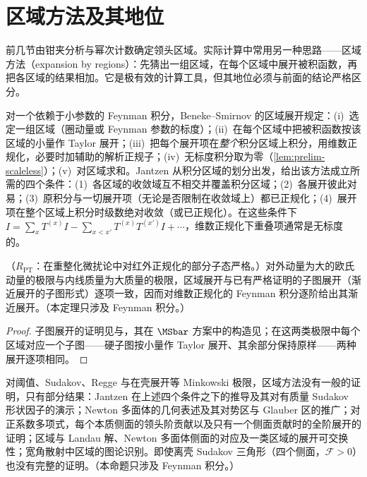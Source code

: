 \section{区域方法及其地位}\label{sec:ir-regions}

前几节由钳夹分析与幂次计数确定领头区域。实际计算中常用另一种思路——区域方法（expansion by regions）：先猜出一组区域，在每个区域中展开被积函数，再把各区域的结果相加。它是极有效的计算工具，但其地位必须与前面的结论严格区分。

\begin{definition}[区域方法]\label{def:ir-regions}
对一个依赖于小参数的 Feynman 积分，Beneke--Smirnov 的区域展开\cite{BenekeSmirnov1998}规定：(i)~选定一组区域（圈动量或 Feynman 参数的标度）；(ii)~在每个区域中把被积函数按该区域的小量作 Taylor 展开；(iii)~把每个展开项在\emph{整个}积分区域上积分，用维数正规化，必要时加辅助的解析正规子；(iv)~无标度积分取为零（\cref{lem:prelim-scaleless}）；(v)~对区域求和。Jantzen 从积分区域的划分出发，给出该方法成立所需的四个条件\cite[第~3~节]{Jantzen2011}：(1)~各区域的收敛域互不相交并覆盖积分区域；(2)~各展开彼此对易；(3)~原积分与一切展开项（无论是否限制在收敛域上）都已正规化；(4)~展开项在整个区域上积分时级数绝对收敛（或已正规化）。在这些条件下 $I=\sum_xT^{(x)}I-\sum_{x<x'}T^{(x)}T^{(x')}I+\cdots$，维数正规化下重叠项通常是无标度的。
\end{definition}

\begin{theorem}\label{thm:ir-regions-euclid}
（$R_{\mathrm{PT}}$：在重整化微扰论中对红外正规化的部分子态严格。）对外动量为大的欧氏动量的极限与内线质量为大质量的极限，区域展开与已有严格证明的子图展开（渐近展开的子图形式）逐项一致，因而对维数正规化的 Feynman 积分逐阶给出其渐近展开。（本定理只涉及 Feynman 积分。）
\end{theorem}
\begin{proof}
子图展开的证明见\cite{Smirnov:1990rz}与\cite{Smirnov2002}，其在 $\MSbar$ 方案中的构造见\cite{Gorishnii1989}；在这两类极限中每个区域对应一个子图——硬子图按小量作 Taylor 展开、其余部分保持原样——两种展开逐项相同\cite{Smirnov2002}。
\end{proof}

\begin{proposition}\label{prop:ir-regions-minkowski}
对阈值、Sudakov、Regge 与在壳展开等 Minkowski 极限，区域方法没有一般的证明，只有部分结果：Jantzen 在上述四个条件之下的推导及其对有质量 Sudakov 形状因子的演示\cite{Jantzen2011}；Newton 多面体的几何表述\cite{Pak:2010pt}及其对势区与 Glauber 区的推广\cite{Jantzen:2012mw}；对正系数多项式，每个本质侧面的领头阶贡献以及只有一个侧面贡献时的全阶展开的证明\cite{Semenova:2018cwy}；区域与 Landau 解、Newton 多面体侧面的对应及一类区域的展开可交换性\cite{Gardi:2022khw}；宽角散射中区域的图论识别\cite{Ma:2023hrt}。即使离壳 Sudakov 三角形（四个侧面，$\mathcal F>0$）也没有完整的证明。（本命题只涉及 Feynman 积分。）
\end{proposition}

